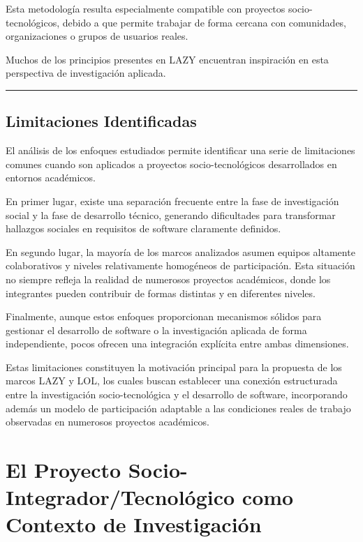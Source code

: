 \documentclass[14pt,a4paper,oneside]{extbook}
\begin{document}
Esta metodología resulta especialmente compatible con proyectos socio-tecnológicos, debido a que permite trabajar de forma cercana con comunidades, organizaciones o grupos de usuarios reales.

Muchos de los principios presentes en LAZY encuentran inspiración en esta perspectiva de investigación aplicada.

\par\vspace{1.5em}\noindent\hfill\rule{0.25\textwidth}{0.6pt}\hfill\par\vspace{1.5em}

\section{Limitaciones Identificadas}

El análisis de los enfoques estudiados permite identificar una serie de limitaciones comunes cuando son aplicados a proyectos socio-tecnológicos desarrollados en entornos académicos.

En primer lugar, existe una separación frecuente entre la fase de investigación social y la fase de desarrollo técnico, generando dificultades para transformar hallazgos sociales en requisitos de software claramente definidos.

En segundo lugar, la mayoría de los marcos analizados asumen equipos altamente colaborativos y niveles relativamente homogéneos de participación. Esta situación no siempre refleja la realidad de numerosos proyectos académicos, donde los integrantes pueden contribuir de formas distintas y en diferentes niveles.

Finalmente, aunque estos enfoques proporcionan mecanismos sólidos para gestionar el desarrollo de software o la investigación aplicada de forma independiente, pocos ofrecen una integración explícita entre ambas dimensiones.

Estas limitaciones constituyen la motivación principal para la propuesta de los marcos LAZY y LOL, los cuales buscan establecer una conexión estructurada entre la investigación socio-tecnológica y el desarrollo de software, incorporando además un modelo de participación adaptable a las condiciones reales de trabajo observadas en numerosos proyectos académicos.



\chapter{El Proyecto Socio-Integrador/Tecnológico como Contexto de Investigación}
\end{document}
